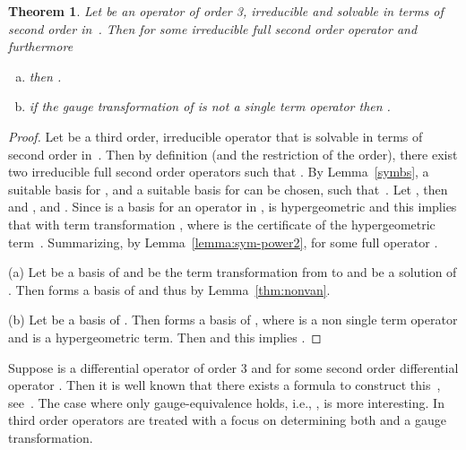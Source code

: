 \documentclass{article}
\newtheorem{theorem}{Theorem}[section]
\begin{document}
\begin{theorem}\label{thm:ord3dec}
  Let  be an operator of order 3, irreducible and solvable in terms of second order in~.
  Then  for some irreducible full second order operator 
  and furthermore
 

\begin{enumerate}[(a)]



\item\label{c1}   then .

 
\item\label{c2} if the gauge transformation of  is not a
  single term operator then .
\end{enumerate}

\end{theorem}

\begin{proof} Let  be a third order, irreducible operator that is
    solvable in terms of second order in~.  Then by definition (and the restriction of
    the order), there exist two irreducible full second order operators 
    such that . By Lemma~\ref{symbs}, a suitable basis 
    for , and a suitable basis  for  can be chosen, such
    that~.  Let , then  and , and
    .  Since  is a basis for an operator in ,  is
    hypergeometric and this implies that  with term transformation
    , where  is the certificate of the hypergeometric term~. Summarizing, by
    Lemma~\ref{lemma:sym-power2},  for some full operator .

  
  (a) Let  be a basis of  and  be the term transformation from  to  and  be a solution of . Then
   forms a basis of  and thus  by Lemma~\ref{thm:nonvan}.
  
 


  (b) Let  be a basis of . Then  forms a basis of , where  is a non
  single term operator and  is a hypergeometric term.  Then  and this implies .
 \end{proof}



 Suppose  is a differential operator of order 3 and  for some
 second order differential operator . Then it is well known that there exists a
 formula to construct this~, see~\cite[Lemma 3.4]{MS85}. The case where only
 gauge-equivalence holds, i.e., , is more interesting.
 In~\cite{vH07} third order operators are treated with a focus on determining both 
 and a gauge transformation.
\end{document}
